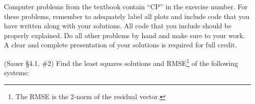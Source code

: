 \documentclass[12pt,fleqn]{exam}
\begin{document}
Computer problems from the textbook contain ``CP'' in the exercise number. For these problems, remember to adequately label all plots and include code that you have written along with your solutions. All code that you include should be properly explained. Do all other problems by hand and make sure to your work. A clear and complete presentation of your solutions is required for full credit.

\begin{questions}

\question (Sauer \S4.1, \#2) Find the least squares solutions and RMSE\footnote{The RMSE is the 2-norm of the residual vector.} of the following systems:



\end{questions}
\end{document}
